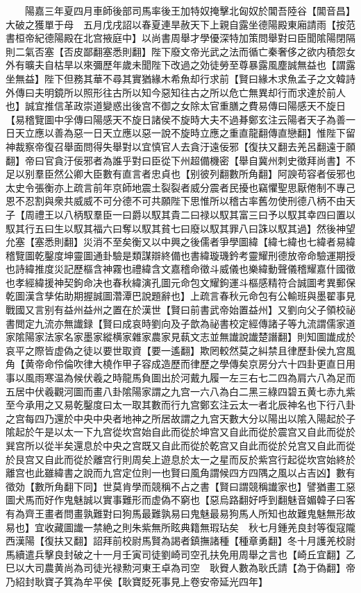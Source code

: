 　　陽嘉三年夏四月車師後部司馬率後王加特奴掩擊北匈奴於閶吾陸谷【閶音昌】大破之獲單于母　五月戊戌詔以春夏連旱赦天下上親自露坐德陽殿東廂請雨【按范書桓帝紀德陽殿在北宫掖庭中】以尚書周舉才學優深特加策問舉對曰臣聞隂陽閉隔則二氣否塞【否皮鄙翻塞悉則翻】陛下廢文帝光武之法而循亡秦奢侈之欲内積怨女外有曠夫自枯旱以來彌歷年歲未聞陛下改過之効徒勞至尊暴露風塵誠無益也【謂露坐無益】陛下但務其華不尋其實猶緣木希魚却行求前【賢曰緣木求魚孟子之文韓詩外傳曰夫明鏡所以照形往古所以知今惡知往古之所以危亡無異却行而求達於前人也】誠宜推信革政崇道變惑出後宫不御之女除太官重膳之費易傳曰陽感天不旋日【易稽覽圖中孚傳曰陽感天不旋日諸侯不旋時大夫不過朞鄭玄注云陽者天子為善一日天立應以善為惡一日天立應以惡一說不旋時立應之重直龍翻傳直戀翻】惟陛下留神裁察帝復召舉面問得失舉對以宜慎官人去貪汙遠佞邪【復扶又翻去羌呂翻遠于願翻】帝曰官貪汙佞邪者為誰乎對曰臣從下州超備機密【舉自冀州刺史徵拜尚書】不足以别羣臣然公卿大臣數有直言者忠貞也【别彼列翻數所角翻】阿諛苟容者佞邪也太史令張衡亦上疏言前年京師地震土裂裂者威分震者民擾也竊懼聖思厭倦制不專己恩不忍割與衆共威威不可分德不可共願陛下思惟所以稽古率舊勿使刑德八柄不由天子【周禮王以八柄馭羣臣一曰爵以馭其貴二曰禄以馭其富三曰予以馭其幸四曰置以馭其行五曰生以馭其福六曰奪以馭其貧七曰廢以馭其罪八曰誅以馭其過】然後神望允塞【塞悉則翻】災消不至矣衡又以中興之後儒者爭學圖緯【緯七緯也七緯者易緯稽覽圖乾鑿度坤靈圖通卦驗是類謀辯終備也書緯璇璣鈐考靈耀刑德放帝命驗運期授也詩緯推度災記歷樞含神霧也禮緯含文嘉稽命徵斗威儀也樂緯動聲儀稽耀嘉什國徵也孝經緯援神契鉤命决也春秋緯演孔圖元命包文耀鉤運斗樞感精符合誠圖考異郵保乾圖漢含孳佑助期握誠圖濳潭巴說題辭也】上疏言春秋元命包有公輸班與墨翟事見戰國又言别有益州益州之置在於漢世【賢曰前書武帝始置益州】又劉向父子領校祕書閲定九流亦無䜟録【賢曰成哀時劉向及子歆為祕書校定經傳諸子等九流謂儒家道家隂陽家法家名家墨家縱横家雜家農家見蓻文志並無䜟說䜟楚譖翻】則知圖䜟成於哀平之際皆虚偽之徒以要世取資【要一遙翻】欺罔較然莫之糾禁且律歷卦侯九宫風角【黄帝命伶倫吹律大橈作甲子容成造歷而律歷之學傳矣京房分六十四卦更直日用事以風雨寒温為候伏羲之時龍馬負圖出於河戴九履一左三右七二四為肩六八為足而五居中伏羲觀河圖而畫八卦隂陽家謂之九宫一六八為白二黑三綠四碧五黄七赤九紫至今承用之又易乾鑿度曰太一取其數而行九宫鄭玄注云太一者北辰神名也下行八卦之宫每四乃還於中央中央者地神之所居故謂之九宫天數大分以陽出以隂入陽起於子隂起於午是以太一下九宫從坎宫始自此而從於坤宫又自此而從於震宫又自此而從於巽宫所以從半矣還息於中央之宫既又自此而從於乾宫又自此而從於兑宫又自此而從於艮宫又自此而從於離宫行則周矣上遊息於太一之星而反於紫宫行起從坎宫始終於離宫也此雖緯書之說而九宫定位則一也賢曰風角謂候四方四隅之風以占吉凶】數有徵効【數所角翻下同】世莫肯學而競稱不占之書【賢曰謂競稱䜟家也】譬猶畫工惡圖犬馬而好作鬼魅誠以實事難形而虚偽不窮也【惡烏路翻好呼到翻魅音媚韓子曰客有為齊王畫者問畫孰難對曰狗馬最難孰易曰鬼魅最易狗馬人所知也故難鬼魅無形故易也】宜收藏圖䜟一禁絶之則朱紫無所眩典籍無瑕玷矣　秋七月鍾羌良封等復寇隴西漢陽【復扶又翻】詔拜前校尉馬賢為謁者鎮撫諸種【種章勇翻】冬十月護羌校尉馬續遣兵擊良封破之十一月壬寅司徒劉崎司空孔扶免用周舉之言也【崎丘宜翻】乙巳以大司農黄尚為司徒光禄勲河東王卓為司空　耿䝿人數為耿氏請【為于偽翻】帝乃紹封耿寶子箕為牟平侯【耿寶貶死事見上卷安帝延光四年】

